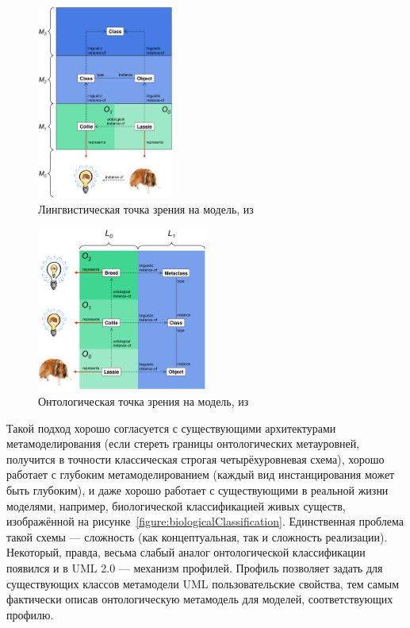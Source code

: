 \documentclass[a5paper]{article}
\begin{document}
\begin{figure}
	\begin{center}
		\includegraphics[width=0.4\textwidth]{linguisticView.png}
	\end{center}
	\caption{Лингвистическая точка зрения на модель, из~\cite{atkinson2003model}}
	\label{figure:linguisticView}
\end{figure}

\begin{figure}
	\begin{center}
		\includegraphics[width=0.5\textwidth]{ontologicalView.png}
	\end{center}
	\caption{Онтологическая точка зрения на модель, из~\cite{atkinson2003model}}
	\label{figure:ontologicalView}
\end{figure}

Такой подход хорошо согласуется с существующими архитектурами метамоделирования (если стереть границы онтологических метауровней, получится в точности классическая строгая четырёхуровневая схема), хорошо работает с глубоким метамоделированием (каждый вид инстанцирования может быть глубоким), и даже хорошо работает с существующими в реальной жизни моделями, например, биологической классификацией живых существ, изображённой на рисунке~\ref{figure:biologicalClassification}. Единственная проблема такой схемы --- сложность (как концептуальная, так и сложность реализации). Некоторый, правда, весьма слабый аналог онтологической классификации появился и в UML 2.0 --- механизм профилей. Профиль позволяет задать для существующих классов метамодели UML пользовательские свойства, тем самым фактически описав онтологическую метамодель для моделей, соответствующих профилю.
\end{document}
